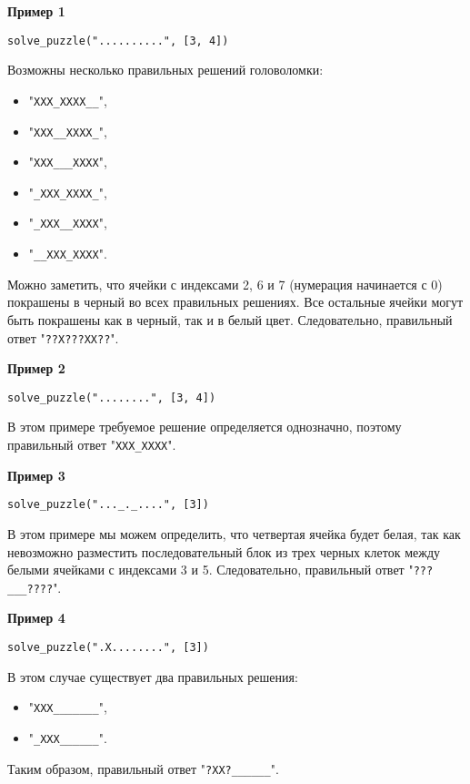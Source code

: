 \textbf{Пример 1}

\texttt{solve\_puzzle("..........", [3, 4])}

Возможны несколько правильных решений головоломки:
\begin{itemize}
\item "\texttt{XXX\_XXXX\_\_}",
\item "\texttt{XXX\_\_XXXX\_}",
\item "\texttt{XXX\_\_\_XXXX}",
\item "\texttt{\_XXX\_XXXX\_}",
\item "\texttt{\_XXX\_\_XXXX}",
\item "\texttt{\_\_XXX\_XXXX}".
\end{itemize}

Можно заметить, что ячейки с индексами 2, 6 и 7 (нумерация начинается с 0) покрашены в черный во всех правильных решениях. Все остальные ячейки могут быть покрашены как в черный, так и в белый цвет. Следовательно, правильный ответ "\texttt{??X???XX??}".

\textbf{Пример 2}

\texttt{solve\_puzzle("........", [3, 4])}

В этом примере требуемое решение определяется однозначно, поэтому правильный ответ "\texttt{XXX\_XXXX}".

\textbf{Пример 3}

\texttt{solve\_puzzle("...\_.\_....", [3])}

В этом примере мы можем определить, что четвертая ячейка будет белая, так как невозможно разместить последовательный блок из трех черных клеток между белыми ячейками с индексами 3 и 5. Следовательно, правильный ответ "\texttt{???\_\_\_????}".

\textbf{Пример 4}

\texttt{solve\_puzzle(".X........", [3])}

В этом случае существует два правильных решения:

\begin{itemize}
\item "\texttt{XXX\_\_\_\_\_\_\_}",
\item "\texttt{\_XXX\_\_\_\_\_\_}".
\end{itemize}

Таким образом, правильный ответ "\texttt{?XX?\_\_\_\_\_\_}".
